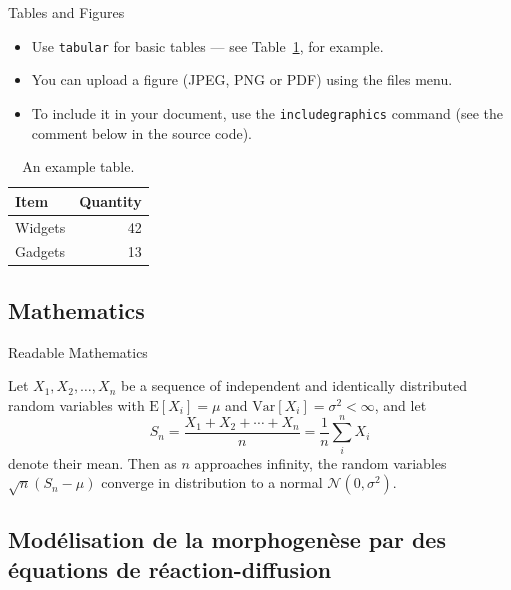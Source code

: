 \documentclass{beamer}
\begin{document}
\begin{frame}{Tables and Figures}

\begin{itemize}
\item Use \texttt{tabular} for basic tables --- see Table~\ref{tab:widgets}, for example.
\item You can upload a figure (JPEG, PNG or PDF) using the files menu. 
\item To include it in your document, use the \texttt{includegraphics} command (see the comment below in the source code).
\end{itemize}


\begin{table}
\centering
\begin{tabular}{l|r}
Item & Quantity \\\hline
Widgets & 42 \\
Gadgets & 13
\end{tabular}
\caption{\label{tab:widgets}An example table.}
\end{table}

\end{frame}

\subsection{Mathematics}

\begin{frame}{Readable Mathematics}

Let $X_1, X_2, \ldots, X_n$ be a sequence of independent and identically distributed random variables with $\text{E}[X_i] = \mu$ and $\text{Var}[X_i] = \sigma^2 < \infty$, and let
\[ S_n = \frac{X_1 + X_2 + \cdots + X_n}{n}
      = \frac{1}{n}\sum_{i}^{n} X_i \]
denote their mean. Then as $n$ approaches infinity, the random variables $\sqrt{n}(S_n - \mu)$ converge in distribution to a normal $\mathcal{N}(0, \sigma^2)$.

\end{frame}



\subsection{Modélisation de la morphogenèse par des équations de réaction-diffusion}
\end{document}
